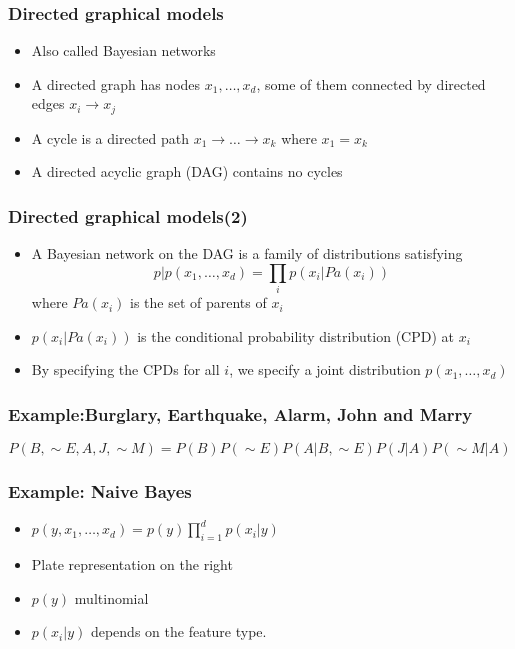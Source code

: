 \documentclass[slidestop,compress,mathserif]{beamer}
\begin{document}
	\begin{frame}
		\frametitle{Directed graphical models}
		\begin{itemize}
			\item Also called Bayesian networks
			\item A directed graph has nodes $x_1,\ldots,x_d$, some of them connected by directed edges $x_i\rightarrow x_j$
			\item A cycle is a directed path $x_1\rightarrow\ldots\rightarrow x_k$ where $x_1=x_k$
			\item A directed acyclic graph (DAG) contains no cycles 
		\end{itemize}
	\end{frame}
	\begin{frame}
		\frametitle{Directed graphical models(2)}
		\begin{itemize}
			\item A Bayesian network on the DAG is a family of distributions satisfying
			$${p|p(x_1,\ldots,x_d)=\prod_ip(x_i|Pa(x_i))}$$
			where $Pa(x_i)$ is the set of parents of $x_i$
			\item $p(x_i|Pa(x_i))$ is the conditional probability distribution (CPD) at $x_i$
			\item By specifying the CPDs for all $i$, we specify a joint distribution $p(x_1,\ldots,x_d)$
		\end{itemize}
	\end{frame}
	\begin{frame}
		\frametitle{Example:Burglary, Earthquake, Alarm, John and Marry}
		\begin{figure}
			
			
		\end{figure}
		$$P(B,\sim E,A,J,\sim M) = P(B)P(\sim E)P(A|B,\sim E)P(J|A)P(\sim M|A)$$
	\end{frame}
	\begin{frame}
		\frametitle{Example: Naive Bayes}
		\begin{figure}
			
			\pgfimage[width=8cm ]{"image/26.png"}
			
		\end{figure}
		\begin{itemize}
			\item $p(y,x_1,\ldots,x_d)=p(y)\prod_{i=1}^{d}p(x_i|y)$
			\item Plate representation on the right
			\item $p(y)$ multinomial
			\item $p(x_i|y)$ depends on the feature type.
		\end{itemize}
	\end{frame}
\end{document}
